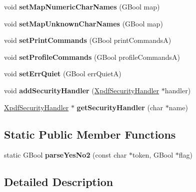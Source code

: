 \begin{DoxyCompactItemize}
\item 
\mbox{\label{class_global_params_ad9fd3ff1b1a82ef7acda4554bccf76e3}} 
void {\bfseries set\+Map\+Numeric\+Char\+Names} (G\+Bool map)
\item 
\mbox{\label{class_global_params_a68cd2648e15e8f431c5f77afbf834707}} 
void {\bfseries set\+Map\+Unknown\+Char\+Names} (G\+Bool map)
\item 
\mbox{\label{class_global_params_ab65221623af482e945695e0f4a62d45b}} 
void {\bfseries set\+Print\+Commands} (G\+Bool print\+CommandsA)
\item 
\mbox{\label{class_global_params_a18f4246b811a62a4411cbca145fd7958}} 
void {\bfseries set\+Profile\+Commands} (G\+Bool profile\+CommandsA)
\item 
\mbox{\label{class_global_params_a223a0b4692ff4b821cbda9036a04744e}} 
void {\bfseries set\+Err\+Quiet} (G\+Bool err\+QuietA)
\item 
\mbox{\label{class_global_params_a536c4d52e372b6b26a42dc9725ab38b5}} 
void {\bfseries add\+Security\+Handler} (\hyperlink{struct_xpdf_security_handler}{Xpdf\+Security\+Handler} $\ast$handler)
\item 
\mbox{\label{class_global_params_abd079f91737cd2f60fd227fd1bda1240}} 
\hyperlink{struct_xpdf_security_handler}{Xpdf\+Security\+Handler} $\ast$ {\bfseries get\+Security\+Handler} (char $\ast$name)
\end{DoxyCompactItemize}
\subsection*{Static Public Member Functions}
\begin{DoxyCompactItemize}
\item 
\mbox{\label{class_global_params_a25d6e1506b597c6af81393804b5a027c}} 
static G\+Bool {\bfseries parse\+Yes\+No2} (const char $\ast$token, G\+Bool $\ast$flag)
\end{DoxyCompactItemize}


\subsection{Detailed Description}


